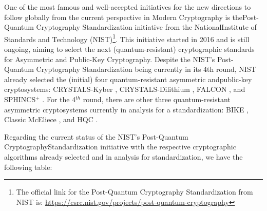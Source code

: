 \documentclass[runningheads]{llncs}
\numberwithin{equation}{section}
\begin{document}
    One of the most famous and well-accepted initiatives for the new directions to follow globally from the current perspective in Modern Cryptography is the\break Post-Quantum Cryptography Standardization initiative from the National\break Institute of Standards and Technology (NIST)\footnote{The official link for the Post-Quantum Cryptography Standardization from NIST is: \url{https://csrc.nist.gov/projects/post-quantum-cryptography}}. This initiative started in 2016 and is still ongoing, aiming to select the next (quantum-resistant) cryptographic standards for Asymmetric and Public-Key Cryptography. Despite the NIST's Post-Quantum Cryptography Standardization being currently in its 4th round, NIST already selected the (initial) four quantum-resistant asymmetric and\break public-key cryptosystems: CRYSTALS-Kyber \cite{bos-et-al:crystals-kyber-cca-secure-module-lattice-based-kem:2018:06-2024,avanzi-et-al:crystals-kyber-algorithm-specifications-and-supporting-documentation:2019:06-2024}, CRYSTALS-Dilithium \cite{ducas-et-al:crystals-dilithium-algorithm-specifications-and-supporting-documentation:2017:06-2024,ducas-et-al:crystals-dilithium-lattice-based-digital-signature-scheme:2018:06-2024}, FALCON \cite{gentry-peikert-vaikuntanathan:trapdoors-hard-lattices-and-new-cryptographic-constructions:2007:06-2024,fouque-et-al:falcon-fast-fourier-lattice-based-compact-signatures-over-ntru:2019:06-2024}, and SPHINCS${}^{+}$ \cite{bernstein-et-al:sphincs-practical-stateless-hash-based-signatures:2015:06-2024,bernstein-et-al:sphincs+-signature-framework:2019:06-2024}. For the 4${}^{th}$ round, there are other three quantum-resistant asymmetric cryptosystems currently in analysis for a standardization: BIKE \cite{misoczki-et-al:mdpc-mceliece-new-mceliece-variants-from-moderate-density-parity-check-codes:2013:06-2024,aragon-et-al:bike-bit-flipping-key-encapsulation:2022:06-2024}, Classic McEliece \cite{mceliece:public-key-cryptosystem-based-algebraic-coding-theory:1978:06-2024,albrecht-et-al:classic-mceliece-conservative-code-based-cryptography:2022:06-2024}, and HQC \cite{melchor-et-al:efficient-encryption-from-random-quasi-cyclic-codes:2018:06-2024,melchor-et-al:hamming-quasi-cyclic:2018:06-2024}.
    
    \newpage
    
    \noindent Regarding the current status of the NIST's Post-Quantum Cryptography\break Standardization initiative with the respective cryptographic algorithms already selected and in analysis for standardization, we have the following table:
\end{document}
